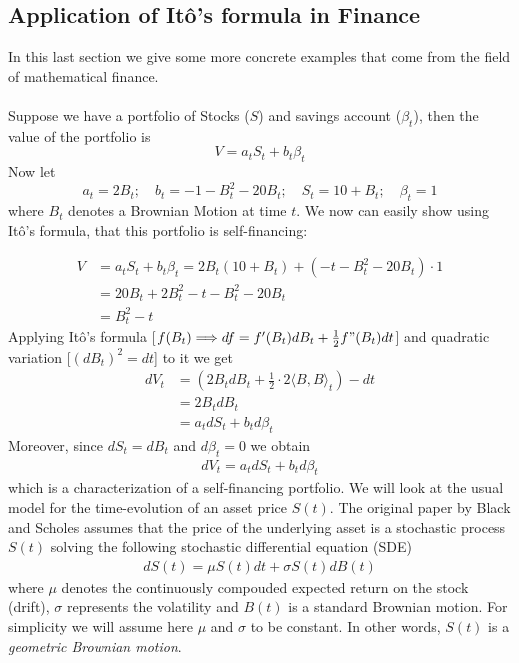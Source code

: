 \documentclass[11pt,a4paper, final]{article}
\begin{document}
\subsection{Application of Itô's formula in Finance}
In this last section we give some more concrete examples that come from the field of mathematical finance.  \\
\\
Suppose we have a portfolio of Stocks ($S$) and savings account ($\beta_t$), then the value of the portfolio is
$$ V=a_t S_t + b_t \beta_t $$
Now let $$a_t=2 B_t;\quad b_t=-1-B_t^2-20 B_t;\quad S_t=10+B_t;\quad \beta_t=1$$
where $B_t$ denotes a Brownian Motion at time $t$.
We now can easily show using Itô's formula, that this portfolio is self-financing:

\begin{align*} V&=a_t S_t + b_t \beta_t = 2 B_t(10+B_t) +(-t-B_t^2-20B_t)\cdot 1\\
&=20B_t + 2B_t^2-t-B_t^2-20B_t \\
&=B_t^2-t 
\end{align*}
Applying Itô's formula [$f(B_t) \Longrightarrow df=f'(B_t)dB_t + \frac{1}{2} f"(B_t)dt$] and quadratic variation [$(dB_t)^2=dt$] to it we get
\begin{align*}  dV_t &= (2B_t dB_t + \frac{1}{2}\cdot 2 \langle B, B \rangle_t)-dt\\
&= 2 B_t dB_t\\
&= a_t dS_t + b_t d\beta_t
\end{align*}
Moreover, since $dS_t = dB_t$ and $d\beta_t=0$ we obtain
\begin{align*}dV_t = a_t dS_t + b_t d\beta_t \end{align*}
which is a characterization of a self-financing portfolio.
\newpage
\noindent We will look at the usual model for the time-evolution of an asset price $S(t)$.
The original paper by Black and Scholes assumes that the price of the underlying asset is a stochastic process $S(t)$ solving the following stochastic differential equation (SDE)
\begin{align*}
dS(t)=\mu S(t) dt + \sigma S(t) dB(t)
\end{align*}
where $\mu$ denotes the continuously compouded expected return on the stock (drift), $\sigma$ represents the volatility and $B(t)$ is a standard Brownian motion. For simplicity we will assume here $\mu$ and $\sigma$ to be constant. 
In other words, $S(t)$ is a \textit{geometric Brownian motion}.\\
\\
\end{document}
